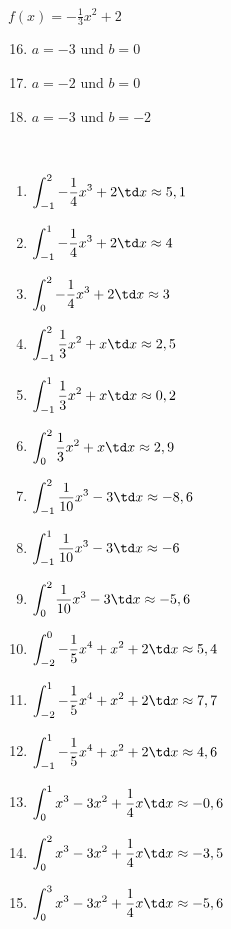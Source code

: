 \begin{Exercise}[title={\raggedright\normalfont Schätze jeweils den Wert der Integrale zwischen der unteren Grenze \(a\) und der oberen Grenze \(b\) an Hand des Schaubilds der Funktion ab.}, label=integralGrafisch1]
\begin{minipage}{\textwidth}
		\begin{minipage}{.33\textwidth}\raggedright
			\(f(x)=-\frac{1}{3}x^2+2\)
			\begin{enumerate}[label=\alph*)]
				\setcounter{enumi}{15}
				\item \(a=-3\) und \(b=0\)
				\item \(a=-2\) und \(b=0\)
				\item \(a=-3\) und \(b=-2\)
			\end{enumerate}
		\end{minipage}
	\end{minipage}
\end{Exercise}

\begin{Answer}[ref=integralGrafisch1]\\
	\begin{enumerate}[label=\alph*)]
		\item \(\displaystyle\int_{-1}^{2} -\frac{1}{4}x^3+2\td x\approx 5,1\)
		\item \(\displaystyle\int_{-1}^{1} -\frac{1}{4}x^3+2\td x\approx 4\)
		\item \(\displaystyle\int_{0}^{2} -\frac{1}{4}x^3+2\td x\approx 3\)
		
		\item \(\displaystyle\int_{-1}^{2} \frac{1}{3}x^2+x\td x\approx 2,5\)
		\item \(\displaystyle\int_{-1}^{1} \frac{1}{3}x^2+x\td x\approx 0,2\)
		\item \(\displaystyle\int_{0}^{2} \frac{1}{3}x^2+x\td x\approx 2,9\)
		
		\item \(\displaystyle\int_{-1}^{2} \frac{1}{10}x^3-3\td x\approx -8,6\)
		\item \(\displaystyle\int_{-1}^{1} \frac{1}{10}x^3-3\td x\approx -6\)
		\item \(\displaystyle\int_{0}^{2} \frac{1}{10}x^3-3\td x\approx -5,6\)
		
		\item \(\displaystyle\int_{-2}^{0} -\frac{1}{5}x^4+x^2+2\td x\approx 5,4\)
		\item \(\displaystyle\int_{-2}^{1} -\frac{1}{5}x^4+x^2+2\td x\approx 7,7\)
		\item \(\displaystyle\int_{-1}^{1} -\frac{1}{5}x^4+x^2+2\td x\approx 4,6\)
		
		\item \(\displaystyle\int_{0}^{1} x^3-3x^2+\frac{1}{4}x\td x\approx -0,6\)
		\item \(\displaystyle\int_{0}^{2} x^3-3x^2+\frac{1}{4}x\td x\approx -3,5\)
		\item \(\displaystyle\int_{0}^{3} x^3-3x^2+\frac{1}{4}x\td x\approx -5,6\)
		

\end{enumerate}
\end{Answer}
